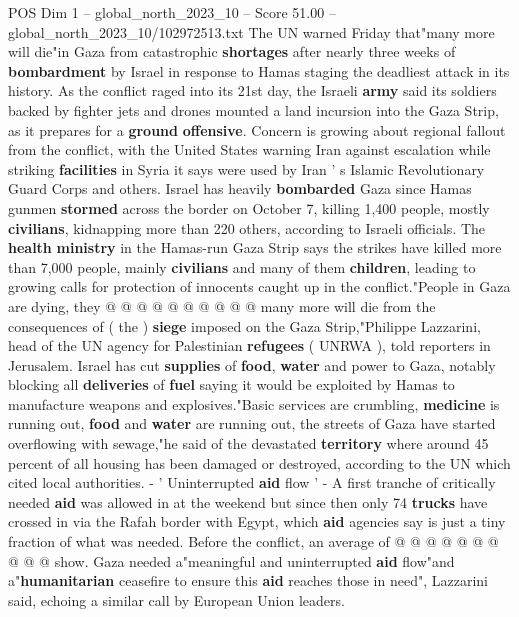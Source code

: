 \begin{textsample}{POS Dim 1 – global\_north\_2023\_10 – Score 51.00 – global\_north\_2023\_10/102972513.txt}  \label{ex:f1_pos_312}
The UN warned Friday that"many more will die"in Gaza from catastrophic \textbf{shortages} after nearly three weeks of \textbf{bombardment} by Israel in response to Hamas staging the deadliest attack in its history.
As the conflict raged into its 21st day, the Israeli \textbf{army} said its soldiers backed by fighter jets and drones mounted a land incursion into the Gaza Strip, as it prepares for a \textbf{ground} \textbf{offensive}.
Concern is growing about regional fallout from the conflict, with the United States warning Iran against escalation while striking \textbf{facilities} in Syria it says were used by Iran ' s Islamic Revolutionary Guard Corps and others.
Israel has heavily \textbf{bombarded} Gaza since Hamas gunmen \textbf{stormed} across the border on October 7, killing 1,400 people, mostly \textbf{civilians}, kidnapping more than 220 others, according to Israeli officials.
The \textbf{health} \textbf{ministry} in the Hamas-run Gaza Strip says the strikes have killed more than 7,000 people, mainly \textbf{civilians} and many of them \textbf{children}, leading to growing calls for protection of innocents caught up in the conflict."People in Gaza are dying, they @ @ @ @ @ @ @ @ @ @ many more will die from the consequences of ( the ) \textbf{siege} imposed on the Gaza Strip,"Philippe Lazzarini, head of the UN agency for Palestinian \textbf{refugees} ( UNRWA ), told reporters in Jerusalem.
Israel has cut \textbf{supplies} of \textbf{food}, \textbf{water} and power to Gaza, notably blocking all \textbf{deliveries} of \textbf{fuel} saying it would be exploited by Hamas to manufacture weapons and explosives."Basic services are crumbling, \textbf{medicine} is running out, \textbf{food} and \textbf{water} are running out, the streets of Gaza have started overflowing with sewage,"he said of the devastated \textbf{territory} where around 45 percent of all housing has been damaged or destroyed, according to the UN which cited local authorities. - ' Uninterrupted \textbf{aid} flow ' - A first tranche of critically needed \textbf{aid} was allowed in at the weekend but since then only 74 \textbf{trucks} have crossed in via the Rafah border with Egypt, which \textbf{aid} agencies say is just a tiny fraction of what was needed.
Before the conflict, an average of @ @ @ @ @ @ @ @ @ @ show.
Gaza needed a"meaningful and uninterrupted \textbf{aid} flow"and a"\textbf{humanitarian} ceasefire to ensure this \textbf{aid} reaches those in need", Lazzarini said, echoing a similar call by European Union leaders.

\end{textsample}
